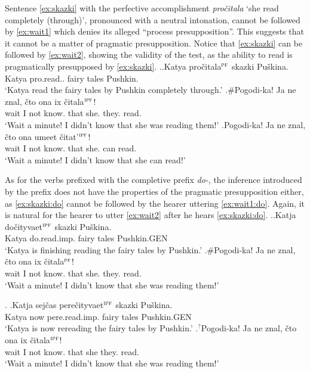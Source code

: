 Sentence \ref{ex:skazki} with the perfective accomplishment \textit{pro\v{c}itala} `she read completely (through)', pronounced with a neutral intonation, cannot be followed by \ref{ex:wait1} which denies its alleged ``process presupposition''. This suggests that it cannot be a matter of pragmatic presupposition. Notice that \ref{ex:skazki} can be followed by \ref{ex:wait2}, showing the validity of the test, as the ability to read is pragmatically presupposed by \ref{ex:skazki}.
\ex.\ag.\label{ex:skazki}Katya pro\v{c}itala$^{\textsc{pf}}$ skazki Pu\v{s}kina.\\
Katya pro.read.. {fairy tales} Pushkin.\\
\trans `Katya read the fairy tales by Pushkin completely through.'
\bg.\#Pogodi-ka! Ja ne znal, \v{c}to ona ix \v{c}itala$^{\textsc{ipf}}$!\label{ex:wait1}\\
wait I not know. that she. they. read.\\
\trans `Wait a minute! I didn't know that she was reading them!'
\bg.\label{ex:wait2}Pogodi-ka! Ja ne znal, \v{c}to ona umeet \v{c}itat'$^{\textsc{ipf}}$!\\
wait I not know. that she. can read.\\
\trans `Wait a minute! I didn't know that she can read!'


As for the verbs prefixed with the completive prefix \textit{do-}, the inference introduced by the prefix does not have the properties of the pragmatic presupposition either, as \ref{ex:skazki:do} cannot be followed by the hearer uttering \ref{ex:wait1:do}. Again, it is natural for the hearer to utter \ref{ex:wait2} after he hears \ref{ex:skazki:do}.
\ex.\ag.\label{ex:skazki:do}Katja do\v{c}ityvaet$^{\textsc{ipf}}$ skazki Pu\v{s}kina.\\
Katya do.read.imp. {fairy tales} Pushkin.{\tiny GEN}\\
\trans `Katya is finishing reading the fairy tales by Pushkin.'
\bg.\#Pogodi-ka! Ja ne znal, \v{c}to ona ix \v{c}itala$^{\textsc{pf}}$!\label{ex:wait1:do}\\
wait I not know. that she. they. read.\\
\trans `Wait a minute! I didn't know that she was reading them!'

\ex. \label{ex:skazki:pere}\ag.\label{ex:skazki:pere1}Katja sej\v{c}as pere\v{c}ityvaet$^{\textsc{ipf}}$ skazki Pu\v{s}kina.\\
Katya now pere.read.imp. {fairy tales} Pushkin.{\tiny GEN}\\
\trans `Katya is now rereading the fairy tales by Pushkin.'
\bg.$^?$Pogodi-ka! Ja ne znal, \v{c}to ona ix \v{c}itala$^{\textsc{ipf}}$!\label{ex:wait1:pere}\\
wait I not know. that she they. read.\\
\trans `Wait a minute! I didn't know that she was reading them!'

